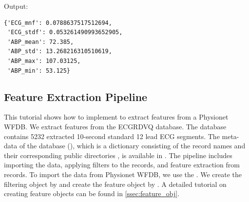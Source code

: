 \documentclass{article}
\begin{document}
Output:
\begin{lstlisting}
{'ECG_mnf': 0.0788637517512694,
 'ECG_stdf': 0.053261490993652905,
 'ABP_mean': 72.385,
 'ABP_std': 13.268216310510619,
 'ABP_max': 107.03125,
 'ABP_min': 53.125}
\end{lstlisting}

\subsection{Feature Extraction Pipeline}
This tutorial shows how to implement  to extract features from a Physionet WFDB.
We extract features from the ECGRDVQ database. The database contains 5232 extracted 10-second standard 12 lead ECG segments. The meta-data of the database (), which is a dictionary consisting of the record names  and their corresponding public directories , is available in . The pipeline includes importing the data, applying filters to the records, and feature extraction from records. To import the data from Physionet WFDB, we use the . We create the filtering object by  and create the feature object by . A detailed tutorial on creating feature objects can be found in \ref{ssec:feature_obj}.
\end{document}
